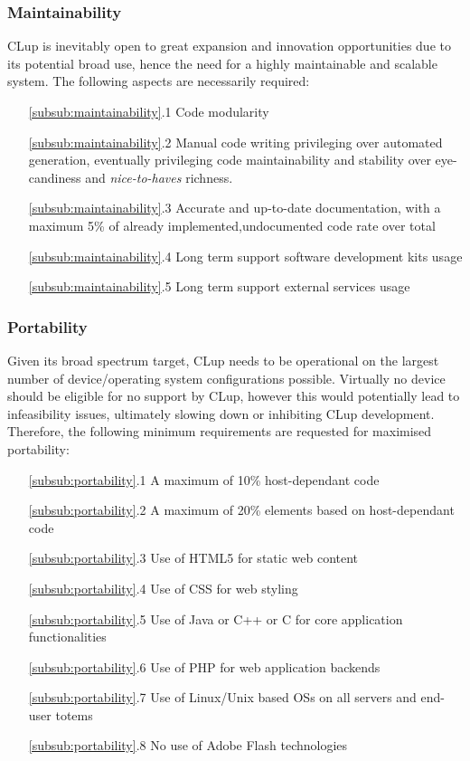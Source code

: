 \subsubsection{Maintainability \label{subsub:maintainability}}
CLup is inevitably open to great expansion and innovation opportunities due to its potential broad use, hence the need for a highly maintainable and scalable system.
The following aspects are necessarily required:\newline
\begin{itemize}[leftmargin=+.8in]
    \item[\ref{subsub:maintainability}.1] Code modularity
    \item[\ref{subsub:maintainability}.2] Manual code writing privileging over automated generation, eventually privileging code maintainability and stability over eye-candiness and \textit{nice-to-haves} richness.
    \item[\ref{subsub:maintainability}.3] Accurate and up-to-date documentation, with a maximum 5\% of already implemented,undocumented code rate over total
    \item[\ref{subsub:maintainability}.4] Long term support software development kits usage
    \item[\ref{subsub:maintainability}.5] Long term support external services usage
\end{itemize}


\subsubsection{Portability \label{subsub:portability}}
Given its broad spectrum target, CLup needs to be operational on the largest number of device/operating system configurations possible. Virtually no device should be eligible for no support by CLup, however this would potentially lead to infeasibility issues, ultimately slowing down or inhibiting CLup development. \newline
Therefore, the following minimum requirements are requested for maximised portability:\newline
\begin{itemize}[leftmargin=+.8in]
    \item[\ref{subsub:portability}.1] A maximum of 10\% host-dependant code
    \item[\ref{subsub:portability}.2] A maximum of 20\% elements based on host-dependant code
    \item[\ref{subsub:portability}.3] Use of HTML5 for static web content
    \item[\ref{subsub:portability}.4] Use of CSS for web styling
    \item[\ref{subsub:portability}.5] Use of Java or C++ or C for core application functionalities
    \item[\ref{subsub:portability}.6] Use of PHP for web application backends
    \item[\ref{subsub:portability}.7] Use of Linux/Unix based OSs on all servers and end-user totems
    \item[\ref{subsub:portability}.8] No use of Adobe \textregistered \space Flash \textregistered \space technologies
\end{itemize}

